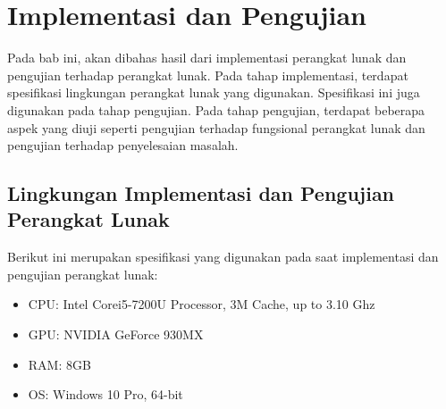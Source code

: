 \chapter{Implementasi dan Pengujian}
Pada bab ini, akan dibahas hasil dari implementasi perangkat lunak dan pengujian terhadap perangkat lunak. Pada tahap implementasi, terdapat spesifikasi lingkungan perangkat lunak yang digunakan. Spesifikasi ini juga digunakan pada tahap pengujian. Pada tahap pengujian, terdapat beberapa aspek yang diuji seperti pengujian terhadap fungsional perangkat lunak dan pengujian terhadap penyelesaian masalah.

\section{Lingkungan Implementasi dan Pengujian Perangkat Lunak}
Berikut ini merupakan spesifikasi yang digunakan pada saat implementasi dan pengujian perangkat lunak:
\begin{itemize}
	\item CPU: Intel\textsuperscript{\textregistered}{ }Core\texttrademark{ }i5-7200U Processor, 3M Cache, up to 3.10 Ghz
	\item GPU: NVIDIA GeForce 930MX
	\item RAM: 8GB
	\item OS: Windows 10 Pro, 64-bit
\end{itemize}

